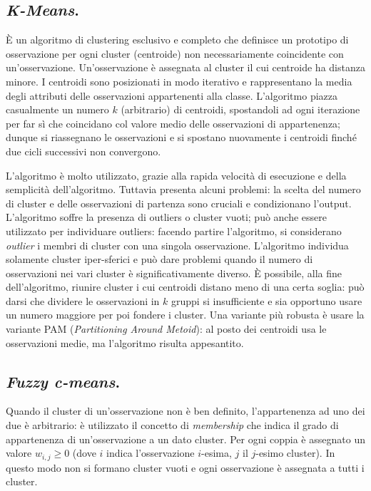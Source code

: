 \documentclass[11pt, a4page, twocolumn]{article}
\begin{document}
\subsection{\textit{K-Means}.}
È un algoritmo di clustering esclusivo e completo che definisce un prototipo di osservazione per ogni cluster (centroide) non necessariamente coincidente con un'osservazione.
Un'osservazione è assegnata al cluster il cui centroide ha distanza minore.
I centroidi sono posizionati in modo iterativo e rappresentano la media degli attributi delle osservazioni appartenenti alla classe.
L'algoritmo piazza casualmente un numero $k$ (arbitrario) di centroidi, spostandoli ad ogni iterazione per far sì che coincidano col valore medio delle osservazioni di appartenenza; dunque si riassegnano le osservazioni e si spostano nuovamente i centroidi finché due cicli successivi non convergono.

L'algoritmo è molto utilizzato, grazie alla rapida velocità di esecuzione e della semplicità dell'algoritmo.
Tuttavia presenta alcuni problemi: la scelta del numero di cluster e delle osservazioni di partenza sono cruciali e condizionano l'output.
L'algoritmo soffre la presenza di outliers o cluster vuoti; può anche essere utilizzato per individuare outliers: facendo partire l'algoritmo, si considerano \textit{outlier} i membri di cluster con una singola osservazione.
L'algoritmo individua solamente cluster iper-sferici e può dare problemi quando il numero di osservazioni nei vari cluster è significativamente diverso.
È possibile, alla fine dell'algoritmo, riunire cluster i cui centroidi distano meno di una certa soglia: può darsi che dividere le osservazioni in $k$ gruppi si insufficiente e sia opportuno usare un numero maggiore per poi fondere i cluster.
Una variante più robusta è usare la variante PAM (\textit{Partitioning Around Metoid}): al posto dei centroidi usa le osservazioni medie, ma l'algoritmo risulta appesantito.

\subsection{\textit{Fuzzy c-means}.}
Quando il cluster di un'osservazione non è ben definito, l'appartenenza ad uno dei due è arbitrario: è utilizzato il concetto di \textit{membership} che indica il grado di appartenenza di un'osservazione a un dato cluster.
Per ogni coppia è assegnato un valore $w_{i,j} \ge 0$ (dove $i$ indica l'osservazione $i$-esima, $j$ il $j$-esimo cluster).
In questo modo non si formano cluster vuoti e ogni osservazione è assegnata a tutti i cluster.
\end{document}
